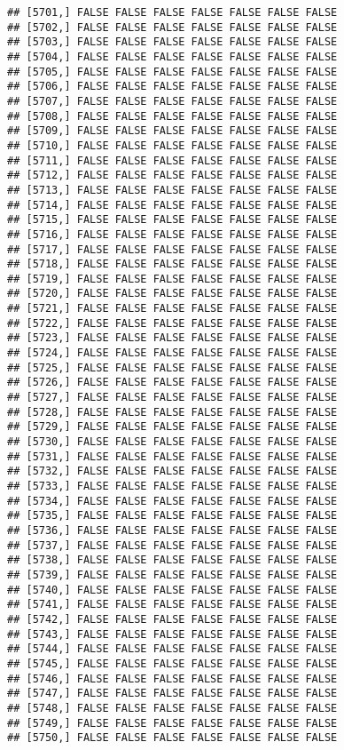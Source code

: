 \documentclass[
]{article}
\begin{document}
\begin{verbatim}
## [5701,] FALSE FALSE FALSE FALSE FALSE FALSE FALSE
## [5702,] FALSE FALSE FALSE FALSE FALSE FALSE FALSE
## [5703,] FALSE FALSE FALSE FALSE FALSE FALSE FALSE
## [5704,] FALSE FALSE FALSE FALSE FALSE FALSE FALSE
## [5705,] FALSE FALSE FALSE FALSE FALSE FALSE FALSE
## [5706,] FALSE FALSE FALSE FALSE FALSE FALSE FALSE
## [5707,] FALSE FALSE FALSE FALSE FALSE FALSE FALSE
## [5708,] FALSE FALSE FALSE FALSE FALSE FALSE FALSE
## [5709,] FALSE FALSE FALSE FALSE FALSE FALSE FALSE
## [5710,] FALSE FALSE FALSE FALSE FALSE FALSE FALSE
## [5711,] FALSE FALSE FALSE FALSE FALSE FALSE FALSE
## [5712,] FALSE FALSE FALSE FALSE FALSE FALSE FALSE
## [5713,] FALSE FALSE FALSE FALSE FALSE FALSE FALSE
## [5714,] FALSE FALSE FALSE FALSE FALSE FALSE FALSE
## [5715,] FALSE FALSE FALSE FALSE FALSE FALSE FALSE
## [5716,] FALSE FALSE FALSE FALSE FALSE FALSE FALSE
## [5717,] FALSE FALSE FALSE FALSE FALSE FALSE FALSE
## [5718,] FALSE FALSE FALSE FALSE FALSE FALSE FALSE
## [5719,] FALSE FALSE FALSE FALSE FALSE FALSE FALSE
## [5720,] FALSE FALSE FALSE FALSE FALSE FALSE FALSE
## [5721,] FALSE FALSE FALSE FALSE FALSE FALSE FALSE
## [5722,] FALSE FALSE FALSE FALSE FALSE FALSE FALSE
## [5723,] FALSE FALSE FALSE FALSE FALSE FALSE FALSE
## [5724,] FALSE FALSE FALSE FALSE FALSE FALSE FALSE
## [5725,] FALSE FALSE FALSE FALSE FALSE FALSE FALSE
## [5726,] FALSE FALSE FALSE FALSE FALSE FALSE FALSE
## [5727,] FALSE FALSE FALSE FALSE FALSE FALSE FALSE
## [5728,] FALSE FALSE FALSE FALSE FALSE FALSE FALSE
## [5729,] FALSE FALSE FALSE FALSE FALSE FALSE FALSE
## [5730,] FALSE FALSE FALSE FALSE FALSE FALSE FALSE
## [5731,] FALSE FALSE FALSE FALSE FALSE FALSE FALSE
## [5732,] FALSE FALSE FALSE FALSE FALSE FALSE FALSE
## [5733,] FALSE FALSE FALSE FALSE FALSE FALSE FALSE
## [5734,] FALSE FALSE FALSE FALSE FALSE FALSE FALSE
## [5735,] FALSE FALSE FALSE FALSE FALSE FALSE FALSE
## [5736,] FALSE FALSE FALSE FALSE FALSE FALSE FALSE
## [5737,] FALSE FALSE FALSE FALSE FALSE FALSE FALSE
## [5738,] FALSE FALSE FALSE FALSE FALSE FALSE FALSE
## [5739,] FALSE FALSE FALSE FALSE FALSE FALSE FALSE
## [5740,] FALSE FALSE FALSE FALSE FALSE FALSE FALSE
## [5741,] FALSE FALSE FALSE FALSE FALSE FALSE FALSE
## [5742,] FALSE FALSE FALSE FALSE FALSE FALSE FALSE
## [5743,] FALSE FALSE FALSE FALSE FALSE FALSE FALSE
## [5744,] FALSE FALSE FALSE FALSE FALSE FALSE FALSE
## [5745,] FALSE FALSE FALSE FALSE FALSE FALSE FALSE
## [5746,] FALSE FALSE FALSE FALSE FALSE FALSE FALSE
## [5747,] FALSE FALSE FALSE FALSE FALSE FALSE FALSE
## [5748,] FALSE FALSE FALSE FALSE FALSE FALSE FALSE
## [5749,] FALSE FALSE FALSE FALSE FALSE FALSE FALSE
## [5750,] FALSE FALSE FALSE FALSE FALSE FALSE FALSE

\end{verbatim}
\end{document}

